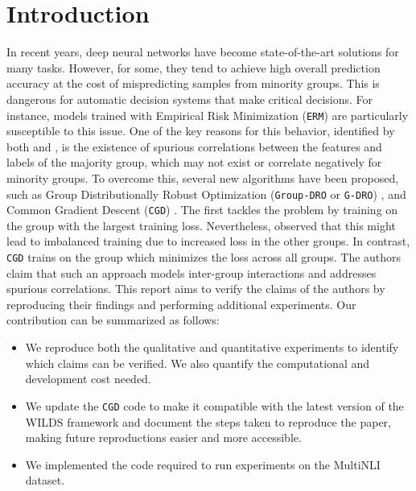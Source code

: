 
\section{Introduction}

In recent years, deep neural networks have become state-of-the-art solutions for many tasks. However, for some, they tend to achieve high overall prediction accuracy at the cost of mispredicting samples from minority groups. This is dangerous for automatic decision systems that make critical decisions. For instance, models trained with Empirical Risk Minimization (\texttt{ERM}) are particularly susceptible to this issue. One of the key reasons for this behavior, identified by both \citet{sagawa2020distributionally} and \citet{koh2021wilds}, is the existence of spurious correlations between the features and labels of the majority group, which may not exist or correlate negatively for minority groups. To overcome this, several new algorithms have been proposed, such as Group Distributionally Robust Optimization (\texttt{Group‐DRO} or \texttt{G-DRO}) \cite{sagawa2020distributionally}, and Common Gradient Descent (\texttt{CGD}) \cite{piratla2022focus}. The first tackles the problem by training on the group with the largest training loss. Nevertheless, \citet{piratla2022focus} observed that this might lead to imbalanced training due to increased loss in the other groups. In contrast, \texttt{CGD} trains on the group which minimizes the loss across all groups. The authors claim that such an approach models inter-group interactions and addresses spurious correlations. This report aims to verify the claims of the authors by reproducing their findings and performing additional experiments. Our contribution can be summarized as follows:

\begin{itemize}
    \item We reproduce both the qualitative and quantitative experiments to identify which claims can be verified. We also quantify the computational and development cost needed.
    \item We update the \texttt{CGD} code to make it compatible with the latest version of the WILDS framework \cite{koh2021wilds} and document the steps taken to reproduce the paper, making future reproductions easier and more accessible.
    \item We implemented the code required to run experiments on the MultiNLI \cite{williams2018broad} dataset.
\end{itemize}


